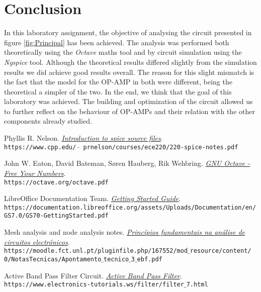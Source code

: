 \clearpage

\section{Conclusion}
\label{sec:conclusion}

In this laboratory assignment, the objective of analysing the circuit presented
in figure \ref{fig:Principal} has been achieved. The analysis was performed both theoretically
using the \emph{Octave} maths tool and by circuit simulation using the \emph{Ngspice} tool.
Although the theoretical results differed slightly from the simulation results we did achieve good results overall.
The reason for this slight mismatch is the fact that the model for the OP-AMP
in both were different, being the theoretical a simpler of the two.
In the end, we think that the goal of this laboratory was achieved. The building and optimization
of the circuit allowed us to further reflect on the behaviour of OP-AMPs and their relation with the other components already studied.


\begin{thebibliography}{9}

    Phyllis R. Nelson.
    \textit{\href{https://www.cpp.edu/~prnelson/courses/ece220/220-spice-notes.pdf}{Introduction to \emph{spice} source files}}.
    \\\texttt{https://www.cpp.edu/ $\tilde{}$ prnelson/courses/ece220/220-spice-notes.pdf}


    John W. Eaton, David Bateman, Søren Hauberg, Rik Wehbring.
    \textit{\href{https://octave.org/octave.pdf}{GNU Octave - Free Your Numbers}}.
    \\\texttt{https://octave.org/octave.pdf}

    LibreOffice Documentation Team.
    \textit{\href{https://documentation.libreoffice.org/assets/Uploads/Documentation/en/GS7.0/GS70-GettingStarted.pdf}{Getting Started Guide}}.
    \\\texttt{https://documentation.libreoffice.org/assets/Uploads/Documentation/en/
        GS7.0/GS70-GettingStarted.pdf}

    Mesh analysis and node analysis notes.
    \textit{\href{https://moodle.fct.unl.pt/pluginfile.php/167552/mod_resource/content/0/NotasTecnicas/Apontamento_tecnico_3_ebf.pdf}{Princípios fundamentais na análise de circuitos electrónicos}}.
    \\\texttt{https://moodle.fct.unl.pt/pluginfile.php/167552/mod$\_$resource/content/
        0/NotasTecnicas/Apontamento$\_$tecnico$\_$3$\_$ebf.pdf}

    Active Band Pass Filter Circuit.
    \textit{\href{https://www.electronics-tutorials.ws/filter/filter_7.html}{Active Band Pass Filter}}.
    \\\texttt{https://www.electronics-tutorials.ws/filter/filter$\_$7.html}

\end{thebibliography}